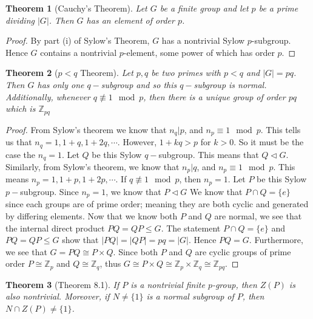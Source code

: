 \documentclass[titlepage]{article}
\theoremstyle{plain}
\newtheorem{theorem}{Theorem}[section]
\theoremstyle{definition}
\theoremstyle{remark}
\theoremstyle{exercise-style}
\numberwithin{equation}{section}
\numberwithin{theorem}{section}
\numberwithin{remark}{section}
\begin{document}
\begin{myboxg}
    \begin{theorem}[Cauchy's Theorem]
        Let $G$ be a finite group and let $p$ be a prime dividing $|G|$. 
        Then $G$ has an element of order $p$.
    \end{theorem}
\end{myboxg}

\begin{proof}
    By part (i) of Sylow's Theorem, $G$ has a nontrivial Sylow $p$-subgroup. 
    Hence $G$ contains a nontrivial $p$-element, some power of which has order $p$.
\end{proof}

\begin{myboxg}
    \begin{theorem}[$p<q$ Theorem]
        Let $p,q $ be two primes with $p< q$ and $|G|=pq$. Then $G$ has only one $q-$subgroup and so this $q-$subgroup is normal. Additionally, whenever $q \not \equiv 1 \mod p$, then there is a unique group of order $pq$ which is $\mathbb{Z}_{pq}$
    \end{theorem}
\end{myboxg}

\begin{proof}
    From Sylow's theorem we know that $n_q|p$, and $n_p \equiv 1\mod p$. This tells us that $n_q = 1, 1+q, 1+2q, \cdots $. However, $1 +kq >p$ for $k>0$. So it must be the case the $n_q = 1$. Let $Q$ be this Sylow $q-$subgroup. This means that $Q \triangleleft G$. Similarly, from Sylow's theorem, we know that $n_p|q$, and $n_p \equiv 1 \mod p$. This means $n_p =1, 1+p, 1+2p, \cdots$. If $q \not \equiv 1 \mod p$, then $n_p = 1$. Let $P$ be this Sylow $p-$subgroup. Since $n_p =1$, we know that $P \triangleleft G$
    \vspace{10pt}
    We know that $P \cap Q = \{ e \}$ since each groups are of prime order; meaning they are both cyclic and generated by differing elements. Now that we know both $P$ and $Q$ are normal, we see that the internal direct product $PQ=QP \leqslant G$. The statement $P\cap Q = \{ e \}$ and $PQ = QP \leqslant G$ show that $|PQ|=|QP|=pq = |G|$. Hence $PQ = G$. Furthermore, we see that $G = PQ \cong P \times Q$. Since both $P$ and $Q$ are cyclic groups of prime order $P \cong \mathbb{Z}_p$ and $Q \cong \mathbb{Z}_q$, thus $G \cong P \times Q \cong \mathbb{Z}_p \times \mathbb{Z}_q \cong \mathbb{Z}_{pq}$.
\end{proof}

\begin{myboxg}
    \begin{theorem}[Theorem 8.1]
        If $P$ is a nontrivial finite $p$-group, then $Z(P)$ is also nontrivial. 
        Moreover, if $N \neq \{1\}$ is a normal subgroup of $P$, then 
        $N \cap Z(P) \neq \{1\}$.
    \end{theorem}
\end{myboxg}
\end{document}
